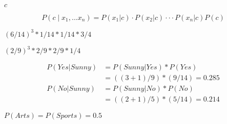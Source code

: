 \documentclass[10pt]{book}
\begin{document}
\begin{mdSnippets}
\begin{mdInlineSnippet}[4a8a08f09d37b73795649038408b5f33]%
$c$\end{mdInlineSnippet}%
\begin{mdDisplaySnippet}[2cb4451452624fd0ce4c3afdd6d51f95]%
\[%
P(c \mid x_1, ... x_n) = P(x_1|c)⋅P(x_2|c)⋅⋅⋅P(x_n|c) P(c)
\]%
\end{mdDisplaySnippet}%
\begin{mdInlineSnippet}[3cf1de5d88668faac4491155789e29e6]%
$(6/14)^3 * 1/14 * 1/14 * 3/4$\end{mdInlineSnippet}%
\begin{mdInlineSnippet}[385b7a3dad381564c253c98b98989f7e]%
$(2/9)^3 * 2/9 * 2/9 * 1/4$\end{mdInlineSnippet}%
\begin{mdDisplaySnippet}[25741163ba39f99bcc2a7256768049ca]%
\[%
\begin{aligned}
P(Yes | Sunny) &= P (Sunny | Yes) * P (Yes) \\
&= ((3+1)/9) * (9/14) = 0.285\\
P(No | Sunny) &= P (Sunny | No) * P (No) \\
&= ((2+1)/5) * (5/14) = 0.214
\end{aligned}
\]%
\end{mdDisplaySnippet}%
\begin{mdInlineSnippet}%
$P(Arts) = P(Sports) = 0.5$\end{mdInlineSnippet}%

\end{mdSnippets}
\end{document}
